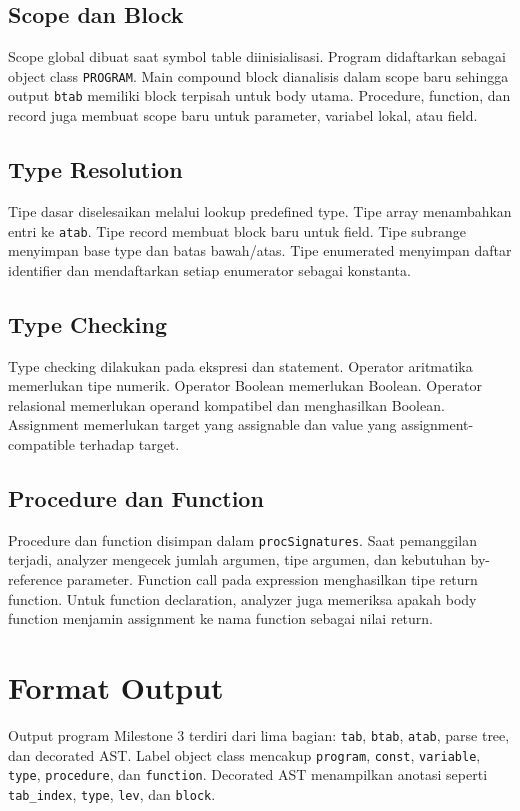 \subsection{Scope dan Block}
Scope global dibuat saat symbol table diinisialisasi. Program didaftarkan sebagai object class \texttt{PROGRAM}. Main compound block dianalisis dalam scope baru sehingga output \texttt{btab} memiliki block terpisah untuk body utama. Procedure, function, dan record juga membuat scope baru untuk parameter, variabel lokal, atau field.

\subsection{Type Resolution}
Tipe dasar diselesaikan melalui lookup predefined type. Tipe array menambahkan entri ke \texttt{atab}. Tipe record membuat block baru untuk field. Tipe subrange menyimpan base type dan batas bawah/atas. Tipe enumerated menyimpan daftar identifier dan mendaftarkan setiap enumerator sebagai konstanta.

\subsection{Type Checking}
Type checking dilakukan pada ekspresi dan statement. Operator aritmatika memerlukan tipe numerik. Operator Boolean memerlukan Boolean. Operator relasional memerlukan operand kompatibel dan menghasilkan Boolean. Assignment memerlukan target yang assignable dan value yang assignment-compatible terhadap target.

\subsection{Procedure dan Function}
Procedure dan function disimpan dalam \texttt{procSignatures}. Saat pemanggilan terjadi, analyzer mengecek jumlah argumen, tipe argumen, dan kebutuhan by-reference parameter. Function call pada expression menghasilkan tipe return function. Untuk function declaration, analyzer juga memeriksa apakah body function menjamin assignment ke nama function sebagai nilai return.

\section{Format Output}
Output program Milestone 3 terdiri dari lima bagian: \texttt{tab}, \texttt{btab}, \texttt{atab}, parse tree, dan decorated AST. Label object class mencakup \texttt{program}, \texttt{const}, \texttt{variable}, \texttt{type}, \texttt{procedure}, dan \texttt{function}. Decorated AST menampilkan anotasi seperti \texttt{tab\_index}, \texttt{type}, \texttt{lev}, dan \texttt{block}.
